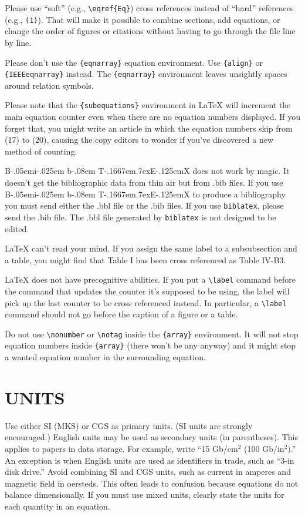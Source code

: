 \documentclass{IEEEoj}
\def\BibTeX{{\rm B\kern-.05em{\sc i\kern-.025em b}\kern-.08em
    T\kern-.1667em\lower.7ex\hbox{E}\kern-.125emX}}
\begin{document}
Please use ``soft'' (e.g., \verb|\eqref{Eq}|) cross references instead
of ``hard'' references (e.g., \verb|(1)|). That will make it possible
to combine sections, add equations, or change the order of figures or
citations without having to go through the file line by line.

Please don't use the \verb|{eqnarray}| equation environment. Use
\verb|{align}| or \verb|{IEEEeqnarray}| instead. The \verb|{eqnarray}|
environment leaves unsightly spaces around relation symbols.

Please note that the \verb|{subequations}| environment in {\LaTeX}
will increment the main equation counter even when there are no
equation numbers displayed. If you forget that, you might write an
article in which the equation numbers skip from (17) to (20), causing
the copy editors to wonder if you've discovered a new method of
counting.

{\BibTeX} does not work by magic. It doesn't get the bibliographic
data from thin air but from .bib files. If you use {\BibTeX} to produce a
bibliography you must send either the .bbl file or the .bib files.
If you use \texttt{biblatex}, please send the .bib file. The .bbl file
generated by \texttt{biblatex} is not designed to be edited.

{\LaTeX} can't read your mind. If you assign the same label to a
subsubsection and a table, you might find that Table I has been cross
referenced as Table IV-B3.

{\LaTeX} does not have precognitive abilities. If you put a
\verb|\label| command before the command that updates the counter it's
supposed to be using, the label will pick up the last counter to be
cross referenced instead. In particular, a \verb|\label| command
should not go before the caption of a figure or a table.

Do not use \verb|\nonumber| or \verb|\notag| inside the \verb|{array}| environment. It
will not stop equation numbers inside \verb|{array}| (there won't be
any anyway) and it might stop a wanted equation number in the
surrounding equation.

\section{UNITS}
Use either SI (MKS) or CGS as primary units. (SI units are strongly 
encouraged.) English units may be used as secondary units (in parentheses). 
This applies to papers in data storage. For example, write ``15 Gb/cm$^{2}$ 
(100 Gb/in$^{2})$.'' An exception is when English units are used as 
identifiers in trade, such as ``3\textonehalf -in disk drive.'' Avoid 
combining SI and CGS units, such as current in amperes and magnetic field in 
oersteds. This often leads to confusion because equations do not balance 
dimensionally. If you must use mixed units, clearly state the units for each 
quantity in an equation.
\end{document}
